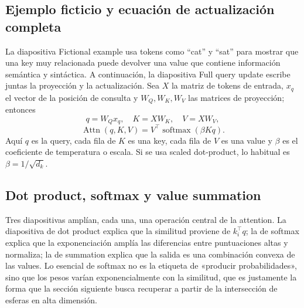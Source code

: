 \subsection{Ejemplo ficticio y ecuación de actualización completa}

La diapositiva Fictional example usa tokens como ``cat'' y ``sat'' para mostrar que una key muy relacionada puede devolver una value que contiene información semántica y sintáctica. A continuación, la diapositiva Full query update escribe juntas la proyección y la actualización. Sea $X$ la matriz de tokens de entrada, $x_q$ el vector de la posición de consulta y $W_Q,W_K,W_V$ las matrices de proyección; entonces
$$
q=W_Qx_q,\quad K=XW_K,\quad V=XW_V,
$$
$$
\operatorname{Attn}(q,K,V)
=V^{\top}\operatorname{softmax}\!\left(\beta Kq\right).
$$
Aquí $q$ es la query, cada fila de $K$ es una key, cada fila de $V$ es una value y $\beta$ es el coeficiente de temperatura o escala. Si se usa scaled dot-product, lo habitual es $\beta=1/\sqrt{d_k}$.



\subsection{Dot product, softmax y value summation}

Tres diapositivas amplían, cada una, una operación central de la attention. La diapositiva de dot product explica que la similitud proviene de $k_i^{\top}q$; la de softmax explica que la exponenciación amplía las diferencias entre puntuaciones altas y normaliza; la de summation explica que la salida es una combinación convexa de las values. Lo esencial de softmax no es la etiqueta de «producir probabilidades», sino que los pesos varían exponencialmente con la similitud, que es justamente la forma que la sección siguiente busca recuperar a partir de la intersección de esferas en alta dimensión.


